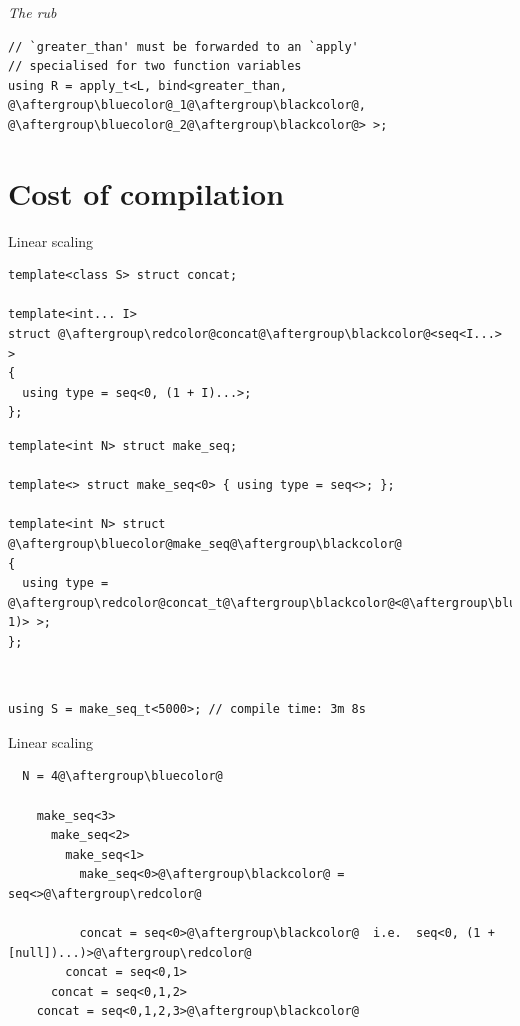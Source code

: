 \documentclass[xcolor=dvipsnames]{beamer}
\begin{document}
\begin{frame}[fragile]{\emph{The rub}}
\begin{lstlisting}
// `greater_than' must be forwarded to an `apply'
// specialised for two function variables
using R = apply_t<L, bind<greater_than, @\aftergroup\bluecolor@_1@\aftergroup\blackcolor@, @\aftergroup\bluecolor@_2@\aftergroup\blackcolor@> >;
\end{lstlisting}
\end{frame}


\section{Cost of compilation}


\begin{frame}[fragile]{Linear scaling}
\begin{lstlisting}
template<class S> struct concat;

template<int... I>
struct @\aftergroup\redcolor@concat@\aftergroup\blackcolor@<seq<I...> >
{
  using type = seq<0, (1 + I)...>;
};
\end{lstlisting}

\begin{lstlisting}
template<int N> struct make_seq;

template<> struct make_seq<0> { using type = seq<>; };

template<int N> struct @\aftergroup\bluecolor@make_seq@\aftergroup\blackcolor@
{
  using type = @\aftergroup\redcolor@concat_t@\aftergroup\blackcolor@<@\aftergroup\bluecolor@make_seq_t@\aftergroup\blackcolor@<(N-1)> >;
};
\end{lstlisting}

~

\begin{lstlisting}
using S = make_seq_t<5000>; // compile time: 3m 8s
\end{lstlisting}
\end{frame}


\begin{frame}[fragile]{Linear scaling}
\begin{lstlisting}
  N = 4@\aftergroup\bluecolor@

    make_seq<3>
      make_seq<2>
        make_seq<1>
          make_seq<0>@\aftergroup\blackcolor@ = seq<>@\aftergroup\redcolor@

          concat = seq<0>@\aftergroup\blackcolor@  i.e.  seq<0, (1 + [null])...)>@\aftergroup\redcolor@
        concat = seq<0,1>
      concat = seq<0,1,2>
    concat = seq<0,1,2,3>@\aftergroup\blackcolor@
\end{lstlisting}
\end{frame}
\end{document}
